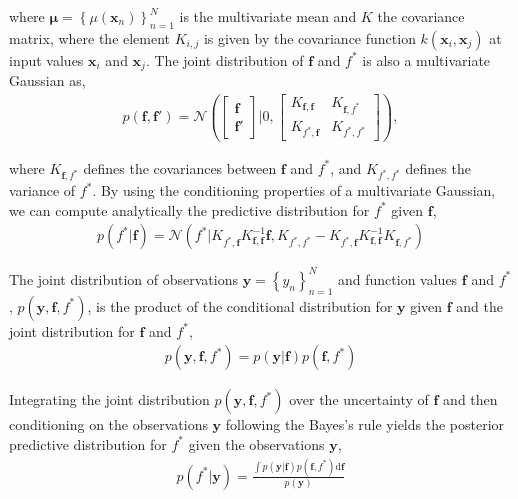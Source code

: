 \documentclass[]{interact}
\theoremstyle{plain}%
\theoremstyle{definition}
\theoremstyle{remark}
\begin{document}
\noindent where $\boldsymbol{\mu} = \left\lbrace \mu(\mathbf{x}_n) \right\rbrace_{n=1}^N$ is the multivariate mean and $K$ the covariance matrix, where the element $K_{i,j}$ is given by the covariance function $k(\mathbf{x}_i,\mathbf{x}_j)$ at input values $\mathbf{x}_i$ and $\mathbf{x}_j$. The joint distribution of $\mathbf{f}$ and $f^*$ is also a multivariate Gaussian as,
%
\begin{eqnarray*}
p(\mathbf{f},\mathbf{f}')=\mathcal{N} \left( \left[ \begin{array}{cc}
\mathbf{f} \\ 
\mathbf{f}'
\end{array} \right] | 0,\left[ \begin{array}{cc}
K_{\mathbf{f},\mathbf{f}} & K_{\mathbf{f},f^*} \\ 
K_{f^*,\mathbf{f}} & K_{f^*,f^*}
\end{array} \right] \right),
\end{eqnarray*} 

\noindent where $K_{\mathbf{f},f^*}$ defines the covariances between $\mathbf{f}$ and $f^*$, and $K_{f^*,f^*}$ defines the variance of $f^*$. By using the conditioning properties of a multivariate Gaussian, we can compute analytically the predictive distribution for $f^*$  given $\mathbf{f}$,
\begin{align*}
	p(f^*| \mathbf{f}) = \mathcal{N}(f^*| K_{f^*,\mathbf{f}} K_{\mathbf{f},\mathbf{f}}^{-1} \mathbf{f},  K_{f^*,f^*}-K_{f^*,\mathbf{f}} K_{\mathbf{f},\mathbf{f}}^{-1} K_{\mathbf{f},f^*}  )
\end{align*}

The joint distribution of observations $\mathbf{y} = \left\lbrace y_n \right\rbrace_{n=1}^N$ and function values $\mathbf{f}$ and $f^*$, $p(\mathbf{y}, \mathbf{f}, f^*)$, is the product of the conditional distribution for $\mathbf{y}$ given $\mathbf{f}$ and the joint distribution for $\mathbf{f}$ and $f^*$,
\begin{align*}
	p(\mathbf{y}, \mathbf{f}, f^*) = p(\mathbf{y}|\mathbf{f})p(\mathbf{f}, f^*)
\end{align*}

Integrating the joint distribution  $p(\mathbf{y}, \mathbf{f}, f^*)$ over the uncertainty of $\mathbf{f}$ and then conditioning on the observations $\mathbf{y}$ following the Bayes's rule yields the posterior predictive distribution for $f^*$ given the observations $\mathbf{y}$,
%
\begin{align*}
	p(f^*|\mathbf{y}) = \frac{\int p(\mathbf{y}|\mathbf{f})p(\mathbf{f}, f^*)\text{d}\mathbf{f}}{p(\mathbf{y})}
\end{align*}
\end{document}
